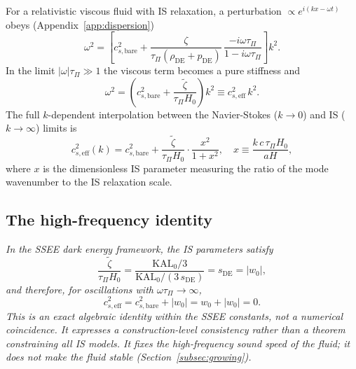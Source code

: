 \documentclass[12pt,a4paper]{article}
\newcommand{\KALz}{\mathrm{KAL}_0}
\newcommand{\wz}{w_0}
\newcommand{\sDE}{s_{\mathrm{DE}}}
\newcommand{\tauPi}{\tau_\Pi}
\newcommand{\ztilde}{\tilde{\zeta}}
\begin{document}
For a relativistic viscous fluid with IS relaxation, a perturbation
$\propto e^{i(kx-\omega t)}$ obeys (Appendix~\ref{app:dispersion})
\begin{equation}
  \omega^2 = \left[c^2_{s,\mathrm{bare}}
    + \frac{\zeta}{\tauPi(\rho_{\mathrm{DE}}+p_{\mathrm{DE}})}\,
      \frac{-i\omega\tauPi}{1-i\omega\tauPi}\right]k^2 .
  \label{eq:disprel_full}
\end{equation}
In the limit $|\omega|\tauPi \gg 1$ the viscous term becomes a pure stiffness and
\begin{equation}
  \omega^2 = \left(c^2_{s,\mathrm{bare}} + \frac{\ztilde}{\tauPi H_0}\right)k^2
  \equiv c^2_{s,\mathrm{eff}}\,k^2.
  \label{eq:cs2_eff_def}
\end{equation}
The full $k$-dependent interpolation between the Navier-Stokes ($k\to 0$) and
IS ($k\to\infty$) limits is
\begin{equation}
  c^2_{s,\mathrm{eff}}(k) = c^2_{s,\mathrm{bare}}
  + \frac{\ztilde}{\tauPi H_0}\cdot\frac{x^2}{1+x^2},
  \quad x \equiv \frac{k\,c\,\tauPi H_0}{aH},
  \label{eq:cs2full}
\end{equation}
where $x$ is the dimensionless IS parameter measuring the ratio of the mode
wavenumber to the IS relaxation scale.

\subsection{The high-frequency identity}
\label{subsec:identity}

\begin{tcolorbox}[colback=blue!5!white,colframe=blue!60!black,title={\textbf{High-frequency marginality (not stability)}}]
\textit{In the SSEE dark energy framework, the IS parameters satisfy}
\begin{equation}
  \frac{\ztilde}{\tauPi H_0}
  = \frac{\KALz/3}{\KALz/(3\,\sDE)}
  = \sDE = |\wz|,
\end{equation}
\textit{and therefore, for oscillations with $\omega\tauPi\to\infty$,}
\begin{equation}
  c^2_{s,\mathrm{eff}}
    = c^2_{s,\mathrm{bare}} + |\wz|
    = \wz + |\wz| = 0.
\end{equation}
\textit{This is an exact algebraic identity within the SSEE constants, not a
numerical coincidence. It expresses a construction-level consistency rather
than a theorem constraining all IS models. It fixes the high-frequency sound
speed of the fluid; it does not make the fluid stable (Section~\ref{subsec:growing}).}
\end{tcolorbox}
\end{document}
